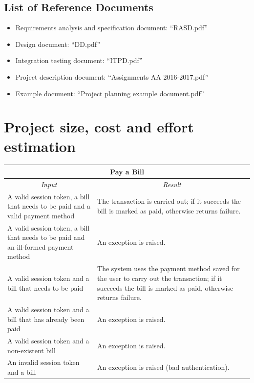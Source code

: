 \documentclass[english]{article}
\begin{document}
\subsection{List of Reference Documents}

\begin{itemize}
	\item{Requirements analysis and specification document: “RASD.pdf”}
	\item{Design document: “DD.pdf”}
	\item{Integration testing document: “ITPD.pdf”}
	\item{Project description document: “Assignments AA 2016-2017.pdf”}
	\item{Example document: “Project planning example document.pdf”}
\end{itemize}

\section{Project size, cost and effort estimation}


\begin{center}
	\begin{tabular}{ | p{6cm} | p{6cm} | }
		\hline 
		\multicolumn{2}{|c|}{\textbf{Pay a Bill}} \\
		\hline
		\multicolumn{1}{|c|}{\textit{Input}} & \multicolumn{1}{c|}{\textit{Result}} \\
		\hline
		A valid session token, a bill that needs to be paid and a valid payment method &  The transaction is carried out; if it succeeds the bill is marked as paid, otherwise returns failure. \\
		\hline
		A valid session token, a bill that needs to be paid and an ill-formed payment method & An exception is raised. \\
		\hline
		A valid session token and a bill that needs to be paid & The system uses the payment method saved for the user to carry out the transaction; if it succeeds the bill is marked as paid, otherwise returns failure. \\
		\hline
		A valid session token and a bill that has already been paid & An exception is raised. \\
		\hline
		A valid session token and a non-existent bill & An exception is raised. \\
		\hline
		An invalid session token and a bill & An exception is raised (bad authentication). \\
		\hline
	\end{tabular}
\end{center}
\end{document}
